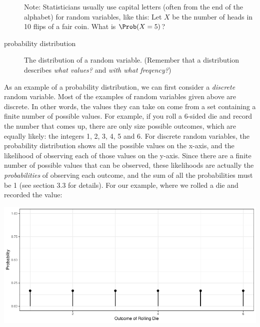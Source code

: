 \documentclass[twoside]{book}\usepackage[]{graphicx}\usepackage[]{xcolor}
\makeatletter
\def\maxwidth{ %
  \ifdim\Gin@nat@width>\linewidth
    \linewidth
  \else
    \Gin@nat@width
  \fi
}
\newenvironment{knitrout}{}{} %
\newcounter{example}[section]
\makeatother
\begin{document}
\begin{description}
Note: Statisticians usually use capital letters (often from the end of the alphabet)
for random variables, like this:  
Let $X$ be the number of heads in 10 flips of a fair coin.  What is $\Prob(X = 5)$?


\item[probability distribution]
The distribution of a random variable.
(Remember that a distribution describes \emph{what values?} and 
\emph{with what freqency?})
\end{description}

As an example of a probability distribution, we can first consider a \emph{discrete} random variable.  Most of the examples of random variables given above are discrete. In other words, the values they can take on come from a set containing a finite number of possible values.  For example, if you roll a 6-sided die and record the number that comes up, there are only size possible outcomes, which are equally likely: the integers 1, 2, 3, 4, 5 and 6.  For discrete random variables, the probability distribution shows all the possible values on the x-axis, and the likelihood of observing each of those values on the y-axis.  Since there are a finite number of possible values that can be observed, these likelihoods are actually the \emph{probabilities} of observing each outcome, and the sum of all the probabilities must be 1 (see section 3.3 for details).  For our example, where we rolled a die and recorded the value:

\begin{knitrout}
\color{fgcolor}

{\centering \includegraphics[width=\maxwidth]{figures/fig-discrete-pmf-1} 

}



\end{knitrout}
\end{document}
